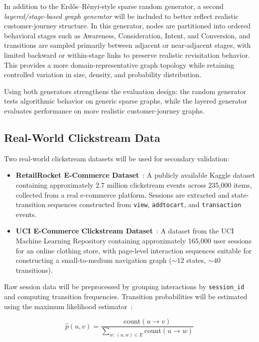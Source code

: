 In addition to the Erd\H{o}s--R\'enyi-style sparse random generator, a second \emph{layered/stage-based graph generator} will be included to better reflect realistic customer-journey structure. In this generator, nodes are partitioned into ordered behavioral stages such as Awareness, Consideration, Intent, and Conversion, and transitions are sampled primarily between adjacent or near-adjacent stages, with limited backward or within-stage links to preserve realistic revisitation behavior. This provides a more domain-representative graph topology while retaining controlled variation in size, density, and probability distribution.

Using both generators strengthens the evaluation design: the random generator tests algorithmic behavior on generic sparse graphs, while the layered generator evaluates performance on more realistic customer-journey graphs.

\subsection{Real-World Clickstream Data}

Two real-world clickstream datasets will be used for secondary validation:

\begin{itemize}
    \item \textbf{RetailRocket E-Commerce Dataset}~\citep{retailrocket2015}: A publicly available Kaggle dataset containing approximately 2.7 million clickstream events across 235,000 items, collected from a real e-commerce platform. Sessions are extracted and state-transition sequences constructed from \texttt{view}, \texttt{addtocart}, and \texttt{transaction} events.
    \item \textbf{UCI E-Commerce Clickstream Dataset}~\citep{uci2008eshop}: A dataset from the UCI Machine Learning Repository containing approximately 165,000 user sessions for an online clothing store, with page-level interaction sequences suitable for constructing a small-to-medium navigation graph (${\sim}12$ states, ${\sim}40$ transitions).
\end{itemize}

Raw session data will be preprocessed by grouping interactions by \texttt{session\_id} and computing transition frequencies. Transition probabilities will be estimated using the maximum likelihood estimator~\citep{norris1998markov}:

\[
\hat{p}(u,v) = \frac{\text{count}(u \to v)}{\displaystyle\sum_{w:\,(u,w)\in E} \text{count}(u \to w)}
\]

